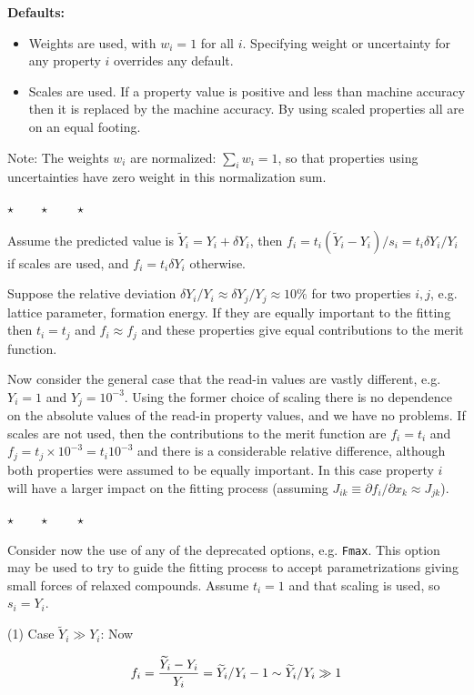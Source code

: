 \documentclass[a4paper,12pt,pdftex,onecolumn]{article}
\newcommand{\stars}{\begin{center}%
\vspace{1em plus 0.5em minus 0.5em}%
$\star \qquad \star \qquad \star$%
\vspace{1em plus 0.5em minus 0.5em}%
\end{center}}
\begin{document}
\textbf{Defaults:}
\begin{itemize}
\item
Weights are used, with $w_i=1$ for all $i$. Specifying weight or uncertainty for
any property $i$ overrides any default.
\item 
Scales are used. If a property value is positive and less than machine accuracy
then it is replaced by the machine accuracy.
By using scaled properties all are on an equal footing.
\end{itemize}

Note: The weights $w_i$ are normalized: $\sum_i w_i = 1$,
so that properties using uncertainties have zero weight in this normalization sum.

\stars

Assume the predicted value is $\widetilde{Y}_i = Y_i + \delta Y_i$, then
$f_i = t_i (\widetilde{Y}_i - Y_i)/s_i = t_i \delta Y_i / Y_i$ if scales are used, and
$f_i = t_i \delta Y_i$ otherwise.

Suppose the relative deviation $\delta Y_i/Y_i \approx \delta Y_j/Y_j \approx 10\%$
for two properties $i,j$,
e.g. lattice parameter, formation energy.
If they are equally important to the fitting then $t_i=t_j$ and $f_i \approx f_j$
and these properties give equal contributions to the
merit function.

Now consider the general case that the read-in values
are vastly different, e.g. $Y_i = 1$ and $Y_j = 10^{-3}$.
Using the former choice of scaling there is no dependence on the absolute values of
the read-in property values, and we have no problems.
If scales are not used, then the contributions to the merit function are
$f_i = t_i$ and $f_j = t_j \times 10^{-3} = t_i 10^{-3}$ and there is a considerable
relative difference, although both properties were assumed to be equally
important. In this case property $i$ will have a larger impact on the
fitting process (assuming $J_{ik} \equiv \partial f_i / \partial x_k \approx J_{jk}$).

\stars

Consider now the use of any of the deprecated options, e.g. \verb+Fmax+.
This option may be used to try to guide the fitting process to accept
parametrizations giving small forces of relaxed compounds.
Assume $t_i=1$ and that scaling is used, so $s_i = Y_i$.

(1) Case $\widetilde{Y}_i \gg Y_i$: Now

\begin{equation}
f_i = {\widetilde{Y}_i - Y_i \over Y_i}
= \widetilde{Y}_i/Y_i - 1 \sim \widetilde{Y}_i/Y_i \gg 1
\end{equation}
\end{document}
